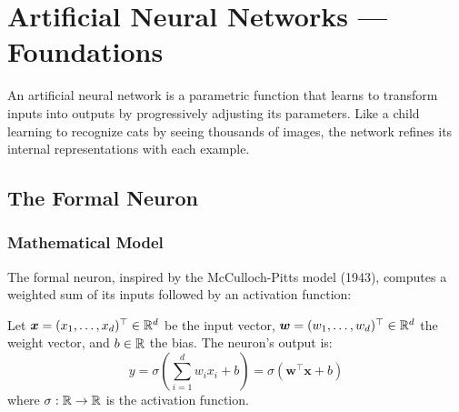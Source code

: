 \chapter{Artificial Neural Networks --- Foundations}
\label{ch:neural_networks}

\begin{intuition}
An artificial neural network is a parametric function that learns to transform inputs into outputs by progressively adjusting its parameters. Like a child learning to recognize cats by seeing thousands of images, the network refines its internal representations with each example.
\end{intuition}

\section{The Formal Neuron}
\label{sec:neuron}

\subsection{Mathematical Model}

The formal neuron, inspired by the McCulloch-Pitts model (1943), computes a weighted sum of its inputs followed by an activation function:

\begin{mathbox}[title=\textbf{Formal Neuron}]
Let $\bm{x} = (x_1, \ldots, x_d)^\top \in \mathbb{R}^d$ be the input vector, $\bm{w} = (w_1, \ldots, w_d)^\top \in \mathbb{R}^d$ the weight vector, and $b \in \mathbb{R}$ the bias. The neuron's output is:
\[
y = \sigma\!\left(\sum_{i=1}^d w_i x_i + b\right) = \sigma(\bm{w}^\top \bm{x} + b)
\]
where $\sigma : \mathbb{R} \to \mathbb{R}$ is the activation function.
\end{mathbox}

\begin{center}
\end{center}


